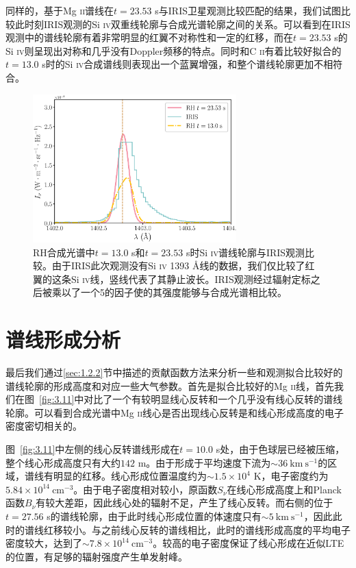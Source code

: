 同样的，基于Mg \textsc{ii}谱线在$t=23.53$ s与IRIS卫星观测比较匹配的结果，我们试图比较此时刻IRIS观测的Si \textsc{iv}双重线轮廓与合成光谱轮廓之间的关系。可以看到在IRIS观测中的谱线轮廓有着非常明显的红翼不对称性和一定的红移，而在$t=23.53$ s的Si \textsc{iv}则呈现出对称和几乎没有Doppler频移的特点。同时和C \textsc{ii}有着比较好拟合的$t=13.0$ s时的Si \textsc{iv}合成谱线则表现出一个蓝翼增强，和整个谱线轮廓更加不相符合。
\begin{figure}
	\centering
	\includegraphics[width=0.7\textwidth]{figs/5F11_IRIS_SiIV}
	\caption{RH合成光谱中$t=13.0$ s和$t=23.53$ s时Si \textsc{iv}谱线轮廓与IRIS观测比较。由于IRIS此次观测没有Si \textsc{iv} 1393 \mbox{\AA}线的数据，我们仅比较了红翼的这条Si \textsc{iv}线，竖线代表了其静止波长。IRIS观测经过辐射定标之后被乘以了一个5的因子使的其强度能够与合成光谱相比较。}
\end{figure}
\section{谱线形成分析}\label{sec:3.7}
最后我们通过\ref{sec:1.2.2}节中描述的贡献函数方法来分析一些和观测拟合比较好的谱线轮廓的形成高度和对应一些大气参数。首先是拟合比较好的Mg \textsc{ii}线，首先我们在图~\ref{fig:3.11}中对比了一个有较明显线心反转和一个几乎没有线心反转的谱线轮廓。可以看到合成光谱中Mg \textsc{ii}线心是否出现线心反转是和线心形成高度的电子密度密切相关的。

图~\ref{fig:3.11}中左侧的线心反转谱线形成在$t=10.0$ s处，由于色球层已经被压缩，整个线心形成高度只有大约$142$ m。由于形成于平均速度下流为$\sim36\ \mathrm{km\  s^{-1}}$的区域，谱线有明显的红移。线心形成位置温度约为$\sim 1.5\times10^4$ K，电子密度约为$5.84\times10^{14}\ \mathrm{cm^{-3}}$。由于电子密度相对较小，原函数$S_\nu$在线心形成高度上和Planck函数$B_\nu$有较大差距，因此线心处的辐射不足，产生了线心反转。而右侧的位于$t=27.56$ s的谱线轮廓，由于此时线心形成位置的体速度只有$\sim 5\ \mathrm{km \  s^{-1}}$，因此此时的谱线红移较小。与之前线心反转的谱线相比，此时的谱线形成高度的平均电子密度较大，达到了$\sim 7.8\times10^{14}\ \mathrm{cm^{-3}}$。较高的电子密度保证了线心形成在近似LTE的位置，有足够的辐射强度产生单发射峰。

